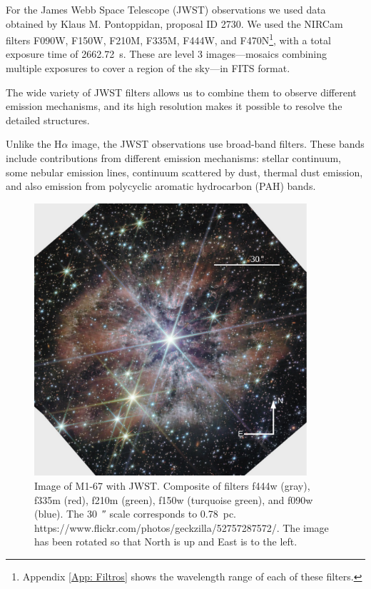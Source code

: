 \documentclass{book}
\begin{document}
For the James Webb Space Telescope (JWST) observations we used data
obtained by Klaus M. Pontoppidan, proposal ID 2730. We used the NIRCam
filters F090W, F150W, F210M, F335M, F444W, and
F470N\footnote{Appendix \ref{App: Filtros} shows the wavelength range
  of each of these filters.}, with a total exposure time of
\SI{2662.72}{s}. These are level 3 images---mosaics combining multiple
exposures to cover a region of the sky---in FITS format.

The wide variety of JWST filters allows us to combine them to observe
different emission mechanisms, and its high resolution makes it
possible to resolve the detailed structures.

Unlike the H$\alpha$ image, the JWST observations use broad-band
filters. These bands include contributions from different emission
mechanisms: stellar continuum, some nebular emission lines, continuum
scattered by dust, thermal dust emission, and also emission from
polycyclic aromatic hydrocarbon (PAH) bands.

\begin{figure}[htb]
    \centering
    \includegraphics[width=0.9\textwidth]{ultimas correcciones/WR124_JWST.pdf}
    \caption{Image of M1-67 with JWST. Composite of filters f444w
      (gray), f335m (red), f210m (green), f150w (turquoise green), and
      f090w (blue). The \SI{30}{\arcsecond} scale corresponds to
      \SI{0.78}{pc}.
      https://www.flickr.com/photos/geckzilla/52757287572/. The image
      has been rotated so that North is up and East is to the left.}
    \label{fig:M1-67JWST}
\end{figure}
\end{document}
